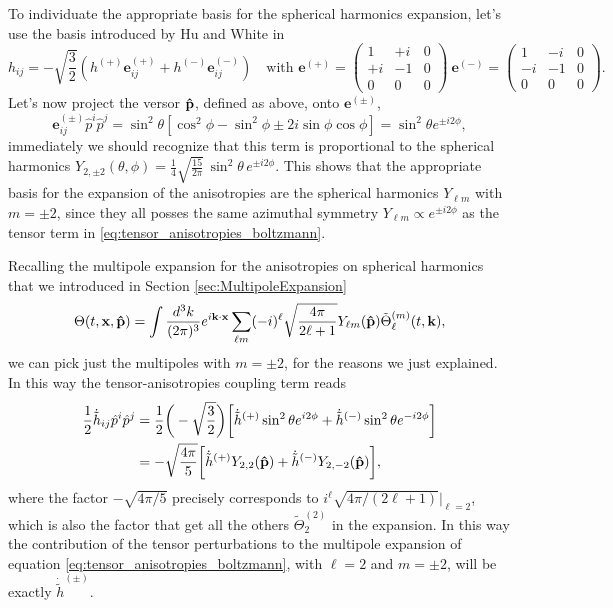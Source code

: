 To individuate the appropriate basis for the spherical harmonics expansion, let's use the basis introduced by Hu and White in \cite{HuWhite}
\begin{equation}
    \label{eq:HuWhiteBasis}
    h_{ij}=-\sqrt{\frac{3}{2}}(h^{(+)}\mathbf{e}_{ij}^{(+)}+h^{(-)}\mathbf{e}_{ij}^{(-)}) \quad \text{with } \mathbf{e}^{(+)}=\begin{pmatrix}
        1&+i&0\\+i&-1&0\\0&0&0
    \end{pmatrix}\ \mathbf{e}^{(-)}=\begin{pmatrix}
        1&-i&0\\-i&-1&0\\0&0&0
    \end{pmatrix}.
\end{equation}
Let's now project the versor $\mathbf{\hat{p}}$, defined as above, onto $\mathbf{e}^{(\pm)}$, 
$$\mathbf{e}_{ij}^{(\pm)}\hat p^i\hat p^j=\sin^2\theta[\cos^2\phi-\sin^2\phi\pm2i\sin\phi\cos\phi]=\sin^2\theta e^{\pm i2\phi},$$
immediately we should recognize that this term is proportional to the spherical harmonics $Y_{2,\pm2}(\theta,\phi)=\frac{1}{4} \sqrt{\frac{15}{2\pi}} \, \sin^2\theta \, e^{ \pm i2\phi}$. This shows that the appropriate basis for the expansion of the anisotropies are the spherical harmonics $Y_{\ell m}$ with $m=\pm2$, since they all posses the same azimuthal symmetry $Y_{\ell m} \propto e^{\pm i2\phi}$ as the tensor term in \eqref{eq:tensor_anisotropies_boltzmann}.

Recalling the multipole expansion for the anisotropies on spherical harmonics that we introduced in Section \ref{sec:MultipoleExpansion}
\begin{equation*}
    \Theta(t,\mathbf x,\mathbf{\hat{p}})=\int\frac{d^3k}{(2\pi)^3}e^{i\mathbf{k}\cdot\mathbf{x}}\sum_{\ell m} (-i)^{\ell}\sqrt{\frac{4\pi}{2\ell+1}}Y_{\ell m}(\mathbf{\hat{p}})\tilde\Theta_{\ell}^{(m)}(t,\mathbf k) ,
\end{equation*}
we can pick just the multipoles with $m=\pm2$, for the reasons we just explained. In this way the tensor-anisotropies coupling term reads 
\begin{align*}
    \frac{1}{2}\dot{\tilde{h}}_{ij}\hat p^i\hat p^j&=\frac{1}{2}\bigg(-\sqrt{\frac{3}{2}}\bigg)\bigg[\dot{\tilde{h}}^{(+)}\sin^2\theta e^{i2\phi}+\dot{\tilde{h}}^{(-)}\sin^2\theta e^{-i2\phi}\bigg]\\&=-\sqrt{\frac{4\pi}{5}}\bigg[\dot{\tilde{h}}^{(+)}Y_{2,2}(\mathbf{\hat{p}})+\dot{\tilde{h}}^{(-)}Y_{2,-2}(\mathbf{\hat{p}})\bigg],
\end{align*}
where the factor $-\sqrt{4\pi/5}$ precisely corresponds to $i^\ell\sqrt{4\pi/(2\ell+1)}|_{\ell=2}$, which is also the factor that get all the others $\tilde\Theta_2^{(2)}$ in the expansion. In this way the contribution of the tensor perturbations to the multipole expansion of equation \eqref{eq:tensor_anisotropies_boltzmann}, with $\ell=2$ and $m=\pm2$, will be exactly $\dot{\tilde{h}}^{(\pm)}$.
